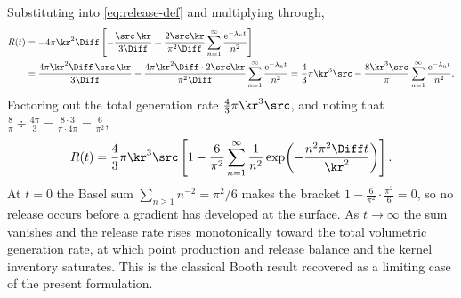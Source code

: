 %
Substituting into \cref{eq:release-def} and multiplying through,
%
\begin{align}
  R(t)
  &= -4\pi \kr^{2} \Diff \left[ -\frac{\src\, \kr}{3\Diff}
   + \frac{2 \src \kr}{\pi^{2} \Diff} \sum_{n=1}^{\infty}
   \frac{\mathrm{e}^{-\lambda_{n} t}}{n^{2}} \right] \notag \\
  &= \frac{4\pi \kr^{2} \Diff\, \src\, \kr}{3\Diff}
   - \frac{4\pi \kr^{2} \Diff \cdot 2 \src \kr}{\pi^{2} \Diff}
   \sum_{n=1}^{\infty} \frac{\mathrm{e}^{-\lambda_{n} t}}{n^{2}}
  = \frac{4}{3}\pi \kr^{3} \src
   - \frac{8 \kr^{3} \src}{\pi}
   \sum_{n=1}^{\infty} \frac{\mathrm{e}^{-\lambda_{n} t}}{n^{2}} .
\end{align}
%
Factoring out the total generation rate $\tfrac{4}{3}\pi \kr^{3} \src$, and noting
that $\tfrac{8}{\pi} \div \tfrac{4\pi}{3} = \tfrac{8 \cdot 3}{\pi \cdot 4\pi}
= \tfrac{6}{\pi^{2}}$,
%
\begin{equation}
  R(t) = \frac{4}{3}\pi \kr^{3} \src
  \left[ 1 - \frac{6}{\pi^{2}} \sum_{n=1}^{\infty} \frac{1}{n^{2}}
  \exp\!\left( -\frac{n^{2}\pi^{2}\Diff t}{\kr^{2}} \right) \right] .
  \label{eq:release}
\end{equation}
%
At $t = 0$ the Basel sum $\sum_{n \ge 1} n^{-2} = \pi^{2}/6$ makes the bracket
$1 - \tfrac{6}{\pi^{2}}\cdot\tfrac{\pi^{2}}{6} = 0$, so no release occurs before a
gradient has developed at the surface. As $t \to \infty$ the sum vanishes and the
release rate rises monotonically toward the total volumetric generation rate, at
which point production and release balance and the kernel inventory saturates. This
is the classical Booth result recovered as a limiting case of the present
formulation.
